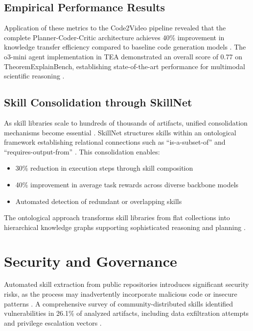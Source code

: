 \documentclass[11pt,a4paper]{article}
\begin{document}
\subsection{Empirical Performance Results}

Application of these metrics to the Code2Video pipeline revealed that the complete Planner-Coder-Critic architecture achieves 40\% improvement in knowledge transfer efficiency compared to baseline code generation models \cite{arxivpdf2024code2video}. The o3-mini agent implementation in TEA demonstrated an overall score of 0.77 on TheoremExplainBench, establishing state-of-the-art performance for multimodal scientific reasoning \cite{teaproject2024, researchgate2024tea}.

\subsection{Skill Consolidation through SkillNet}

As skill libraries scale to hundreds of thousands of artifacts, unified consolidation mechanisms become essential \cite{huggingface2024consolidation, huggingface2024unified}. SkillNet structures skills within an ontological framework establishing relational connections such as ``is-a-subset-of'' and ``requires-output-from'' \cite{huggingface2024consolidation, huggingface2024unified}. This consolidation enables:

\begin{itemize}
\item 30\% reduction in execution steps through skill composition
\item 40\% improvement in average task rewards across diverse backbone models
\item Automated detection of redundant or overlapping skills
\end{itemize}

The ontological approach transforms skill libraries from flat collections into hierarchical knowledge graphs supporting sophisticated reasoning and planning \cite{huggingface2024consolidation, huggingface2024unified}.

\section{Security and Governance}

Automated skill extraction from public repositories introduces significant security risks, as the process may inadvertently incorporate malicious code or insecure patterns \cite{researchgate2024agentskills, claude2024agentskills}. A comprehensive survey of community-distributed skills identified vulnerabilities in 26.1\% of analyzed artifacts, including data exfiltration attempts and privilege escalation vectors \cite{researchgate2024agentskills}.
\end{document}
